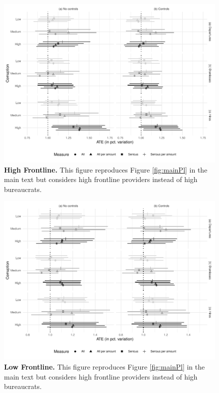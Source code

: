 {\begin{figure}[H]
    \centering
    \includegraphics{chapters/chapter_2/figures/pl_frontline_high.pdf}
    \caption{{\bf High Frontline.} This figure reproduces Figure \ref{fig:mainPl} in the main text but considers high frontline providers instead of high bureaucrats.}
    \label{fig:plHighFrontline}
\end{figure}

\begin{figure}[H]
    \centering
    \includegraphics{chapters/chapter_2/figures/pl_frontline_low.pdf}
    \caption{{\bf Low Frontline.} This figure reproduces Figure \ref{fig:mainPl} in the main text but considers high frontline providers instead of high bureaucrats.}
    \label{fig:plLowFrontline}
\end{figure}

}

